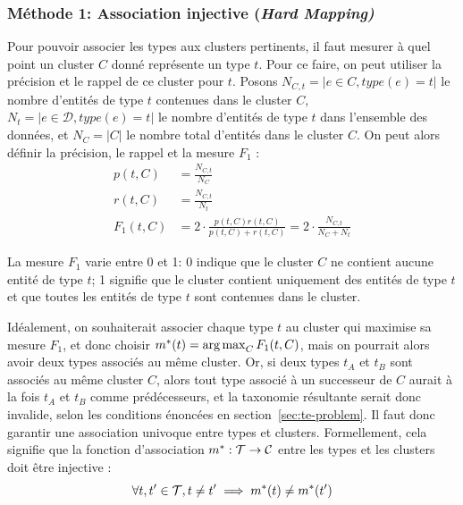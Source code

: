 \subsubsection{Méthode 1: Association injective (\textit{Hard Mapping)}}
\label{ssubsec:te-hardmapping}

Pour pouvoir associer les types aux clusters pertinents, il faut mesurer à quel point un cluster $C$ donné représente un type $t$. Pour ce faire, on peut utiliser la précision et le rappel de ce cluster pour $t$. Posons $N_{C,t} = | e \in C, type(e) = t|$ le nombre d'entités de type $t$ contenues dans le cluster $C$,
$N_t = |e \in \mathcal{D}, type(e) = t|$ le nombre d'entités de type $t$ dans l'ensemble des données, et $N_C = | C |$ le nombre total d'entités dans le cluster $C$. On peut alors définir la précision, le rappel et la mesure $F_1$ :
\begin{align}
    p(t, C) &= \frac{N_{C, t}}{N_C} \\
    r(t, C) &= \frac{N_{C, t}}{N_t} \\
    F_1(t, C) &= 2 \cdot \frac{p(t, C)r(t, C)}{p(t, C) + r(t, C)} = 2 \cdot \frac{N_{C,t}}{N_C + N_t}
\end{align}

La mesure $F_1$ varie entre 0 et 1: 0 indique que le cluster $C$ ne contient aucune entité de type $t$; 1 signifie que le cluster contient uniquement des entités de type $t$ et que toutes les entités de type $t$ sont contenues dans le cluster. 


Idéalement, on souhaiterait associer chaque type $t$ au cluster qui maximise sa mesure $F_1$, et donc choisir $m^*(t) = \operatorname*{arg\,max}_C F_1(t, C)$, mais on pourrait alors avoir deux types associés au même cluster. Or, si deux types $t_A$ et $t_B$ sont associés au même cluster $C$, alors tout type associé à un successeur de $C$ aurait à la fois $t_A$ et $t_B$ comme prédécesseurs, et la taxonomie résultante serait donc invalide, selon les conditions énoncées en section~\ref{sec:te-problem}. Il faut donc garantir une association univoque entre types et clusters. Formellement, cela signifie que la fonction d'association $m^* : \mathcal{T} \rightarrow \mathcal{C}$ entre les types et les clusters doit être injective :
\begin{equation}
    \forall t, t' \in \mathcal{T}, t \neq t' \implies m^*(t) \neq m^*(t')
\end{equation}


